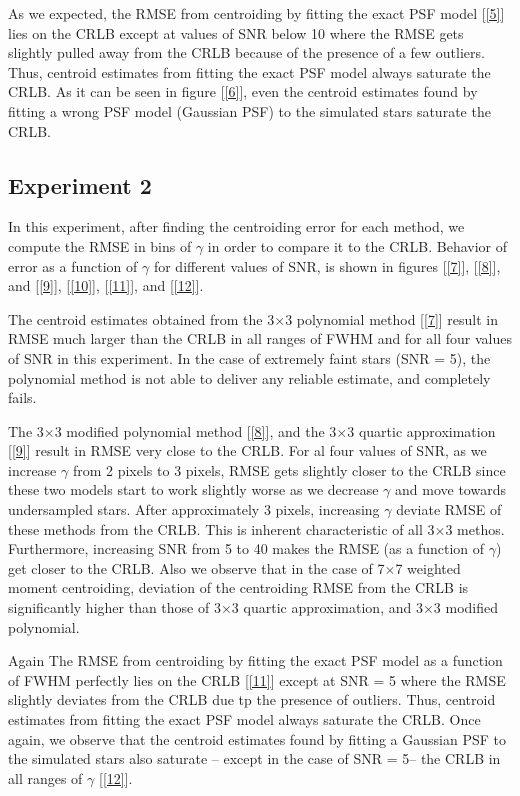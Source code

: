 \documentclass[12pt, preprint]{aastex}
\begin{document}
As we expected, the RMSE from centroiding by fitting the exact PSF model [\ref{5}]
lies on the CRLB except at values of SNR below 10 where the RMSE gets slightly pulled away
from the CRLB because of the presence of a few outliers.
Thus, centroid estimates from fitting the exact PSF model always
saturate the CRLB. As it can be seen in figure [\ref{6}],
even the centroid estimates found by fitting a wrong PSF model (Gaussian PSF)
to the simulated stars saturate the CRLB.

\subsection{Experiment 2}
In this experiment, after finding the centroiding error for each method, we
compute the RMSE in bins of $\gamma$ in order to compare it to the CRLB. 
Behavior of error as a function of $\gamma$ for different values of SNR,
is shown in figures [\ref{7}], [\ref{8}], and [\ref{9}], [\ref{10}], [\ref{11}], and [\ref{12}]. 
 
The centroid estimates obtained from the 3$\times$3 polynomial method [\ref{7}]
result in RMSE much larger than the CRLB in all ranges of FWHM and for all four
values of SNR in this experiment. In the case of extremely faint stars (SNR = 5),
the polynomial method is not able to deliver any reliable estimate, and completely fails.

The 3$\times$3 modified polynomial method [\ref{8}], and the 3$\times$3
quartic approximation [\ref{9}] result in RMSE very close to the CRLB.
For al four values of SNR, as we increase $\gamma$ from 2 pixels to 3 pixels,
RMSE gets slightly closer to the CRLB since these two models start to work
slightly worse as we decrease $\gamma$ and move towards undersampled stars.
After approximately 3 pixels, increasing $\gamma$ deviate RMSE of these methods from the CRLB.
This is inherent characteristic of all 3$\times$3 methos. 
Furthermore, increasing SNR from 5 to 40 makes the RMSE (as a function of $\gamma$) get
closer to the CRLB. Also we observe that in the case of 7$\times$7 weighted moment 
centroiding, deviation of the centroiding RMSE from the CRLB is significantly higher
than those of 3$\times$3 quartic approximation, and 3$\times$3 modified polynomial.

Again The RMSE from centroiding by fitting the exact PSF model as a function of FWHM
perfectly lies on the CRLB [\ref{11}] except at SNR = 5 where the RMSE slightly deviates
from the CRLB due tp the presence of outliers. Thus, centroid estimates from fitting
the exact PSF model always saturate the CRLB. Once again, we observe that the centroid
estimates found by fitting a Gaussian PSF to the simulated stars also saturate
-- except in the case of SNR = 5-- the CRLB in all ranges of $\gamma$ [\ref{12}].
\end{document}
